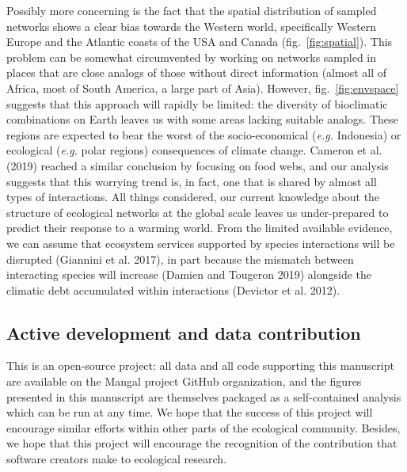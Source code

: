 \documentclass[10pt,oneside]{article}
\begin{document}
Possibly more concerning is the fact that the spatial distribution of
sampled networks shows a clear bias towards the Western world,
specifically Western Europe and the Atlantic coasts of the USA and
Canada (fig.~\ref{fig:spatial}). This problem can be somewhat
circumvented by working on networks sampled in places that are close
analogs of those without direct information (almost all of Africa, most
of South America, a large part of Asia). However,
fig.~\ref{fig:envspace} suggests that this approach will rapidly be
limited: the diversity of bioclimatic combinations on Earth leaves us
with some areas lacking suitable analogs. These regions are expected to
bear the worst of the socio-economical (\emph{e.g.} Indonesia) or
ecological (\emph{e.g.} polar regions) consequences of climate change.
Cameron et al. (2019) reached a similar conclusion by focusing on food
webs, and our analysis suggests that this worrying trend is, in fact,
one that is shared by almost all types of interactions. All things
considered, our current knowledge about the structure of ecological
networks at the global scale leaves us under-prepared to predict their
response to a warming world. From the limited available evidence, we can
assume that ecosystem services supported by species interactions will be
disrupted (Giannini et al. 2017), in part because the mismatch between
interacting species will increase (Damien and Tougeron 2019) alongside
the climatic debt accumulated within interactions (Devictor et al.
2012).

\hypertarget{active-development-and-data-contribution}{%
\subsection{Active development and data
contribution}\label{active-development-and-data-contribution}}

This is an open-source project: all data and all code supporting this
manuscript are available on the Mangal project GitHub organization, and
the figures presented in this manuscript are themselves packaged as a
self-contained analysis which can be run at any time. We hope that the
success of this project will encourage similar efforts within other
parts of the ecological community. Besides, we hope that this project
will encourage the recognition of the contribution that software
creators make to ecological research.
\end{document}
